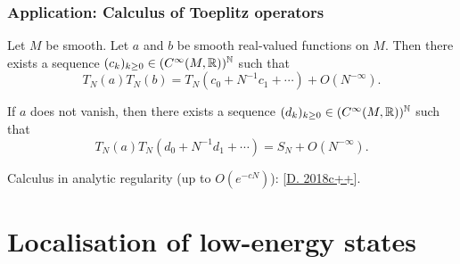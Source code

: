 \documentclass[mathserif]{beamer}
\newcommand{\mycite}[1]{{\color{mygreen} \small #1}}
\begin{document}
  \begin{frame}
    \frametitle{Application: Calculus of Toeplitz operators}

    \begin{theorem}[{\mycite{[Schlichenmaier 1999]}}]Let $M$ be smooth. Let $a$ and $b$ be
      smooth real-valued functions on $M$. Then there exists a sequence $(c_k)_{k\geq
        0}\in (C^{\infty}(M,\mathbb{R}))^{\mathbb{N}}$ such that
      \[
        T_N(a)T_N(b)=T_N(c_0+N^{-1}c_1+\cdots)+O(N^{-\infty}).
        \]

        If $a$ does not vanish, then there exists a sequence
        $(d_k)_{k\geq 0}\in (C^{\infty}(M,\mathbb{R}))^{\mathbb{N}}$ such that
        \[
          T_N(a)T_N(d_0+N^{-1}d_1+\cdots)=S_N+O(N^{-\infty}).
          \]
        \end{theorem}
        Calculus in analytic regularity (up to $O(e^{-cN})$):
        \mycite{[\underline{D. 2018c++}]}.
  \end{frame}


\section{Localisation of low-energy states}
\end{document}
